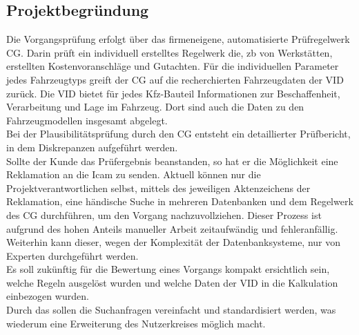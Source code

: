 \subsection{Projektbegründung} 
\label{sec:Projektbegruendung}
Die Vorgangsprüfung erfolgt über das firmeneigene, automatisierte Prüfregelwerk \ac{CG}.
Darin prüft ein individuell erstelltes Regelwerk die, \acs{zb} von Werkstätten, erstellten
Kostenvoranschläge und Gutachten. Für die individuellen Parameter jedes Fahrzeugtyps greift
der \acs{CG} auf die recherchierten Fahrzeugdaten der \ac{VID} zurück. 
Die \acs{VID} bietet für jedes Kfz-Bauteil Informationen zur Beschaffenheit, Verarbeitung und Lage im Fahrzeug.
Dort sind auch die Daten zu den Fahrzeugmodellen insgesamt abgelegt.\\
Bei der Plausibilitätsprüfung durch den \acs{CG} entsteht ein detaillierter Prüfbericht, in dem 
Diskrepanzen aufgeführt werden.\\
Sollte der Kunde das Prüfergebnis beanstanden, so hat er die Möglichkeit eine Reklamation an
die \acs{Icam} zu senden.
Aktuell können nur die Projektverantwortlichen selbst, mittels des jeweiligen Aktenzeichens der
Reklamation, eine händische Suche in mehreren Datenbanken und dem Regelwerk des \acs{CG}
durchführen, um den Vorgang nachzuvollziehen. Dieser Prozess ist aufgrund des hohen Anteils manueller 
Arbeit zeitaufwändig und fehleranfällig. Weiterhin kann dieser, wegen der Komplexität der Datenbanksysteme, 
nur von Experten durchgeführt werden.\\ 
Es soll zukünftig für die Bewertung eines Vorgangs kompakt ersichtlich sein, 
welche Regeln ausgelöst wurden und welche Daten der \acs{VID} in die Kalkulation einbezogen wurden.\\
Durch das  sollen die Suchanfragen vereinfacht und standardisiert werden, was wiederum 
eine Erweiterung des Nutzerkreises möglich macht.

